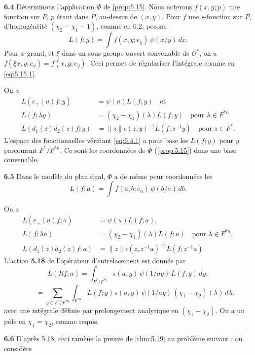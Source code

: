 \documentclass[12pt,a4paper]{article}
\theoremstyle{plain}
\theoremstyle{definition}
\theoremstyle{remark}
\newcommand{\cO}{\mathcal{O}}
\providecommand{\cO}{\mathcal{O}}
\begin{document}
\textbf{6.4} Déterminons l'application $\Phi$ de \ref{prop:5.15}. Nous noterons $f(x, y; p)$ une fonction sur $P$, $p$ étant dans $P$, au-dessus de $(x, y)$. Pour $f$ une $\epsilon$-fonction sur $P$, d'homogénéité $(\chi_2 - \chi_1 - 1)$, comme en 6.2, posons
\[
L(f; y) = \int f(x, y; e_y) \, \psi(x/y) \, dx.
\]
Pour $x$ grand, et $\xi$ dans un sous-groupe ouvert convenable de $\cO^*$, on a $f(\xi x, y; e_y) = f(x, y; e_y)$. Ceci permet de régulariser l'intégrale comme en \eqref{eq:5.15.1}.

On a
\begin{align}
L(e_+(u)f; y) &= \psi(u) L(f; y) \quad \text{et} \label{eq:6.4.1} \\
L(f; \lambda y) &= (\chi_2 - \chi_1)(\lambda) L(f; y) \quad \text{pour } \lambda \in F^{*n} \label{eq:6.4.2} \\
L(d_1(z) d_2(z) f; y) &= \|z\| \epsilon(z, y)^{-1} L(f; z^{-1} y) \quad \text{pour } z \in F^*. \label{eq:6.4.3}
\end{align}
L'espace des fonctionnelles vérifiant \eqref{eq:6.4.1} a pour base les $L(f; y)$ pour $y$ parcourant $F^*/F^{*n}$. Ce sont les coordonnées de $\Phi$ (\ref{prop:5.15}) dans une base convenable.

\textbf{6.5} Dans le modèle du plan dual, $\Phi$ a de même pour coordonnées les
\[
L(f; a) = \int f(a, b; e_a) \, \psi(b/a) \, db.
\]

On a
\begin{align}
L(e_+(u)f; a) &= \psi(u) L(f; a), \label{eq:6.5.1} \\
L(f; \lambda a) &= (\chi_2 - \chi_1)(\lambda) L(f; a) \quad \text{pour } \lambda \in F^{*n}, \label{eq:6.5.2} \\
L(d_1(z) d_2(z) f; a) &= \|z\| \epsilon(z, z^{-1} a)^{-1} L(f; z^{-1} a). \label{eq:6.5.3}
\end{align}
L'action \textbf{5.18} de l'opérateur d'entrelacement est donnée par
\begin{equation}\label{eq:6.5.4}
L(Rf; a) = \int_{F^*/F^{*n}} \epsilon(a, y) \, \psi(1/ay) \, L(f; y) \, dy,
\tag{6.5.4}
\end{equation}
\[
\qquad = \sum_{y \in F^*/F^{*n}} \int_{F^{*n}} L(f; y) \, \epsilon(a, y) \, \psi(1/ay) \, (\chi_1 - \chi_2)(\lambda) \, d\lambda.
\]
avec une intégrale définie par prolongement analytique en $(\chi_1 - \chi_2)$. On a un pôle en $\chi_1 = \chi_2$, comme requis.

\textbf{6.6} D'après 5.18, ceci ramène la preuve de \ref{thm:5.19} au problème suivant : on considère
\end{document}
